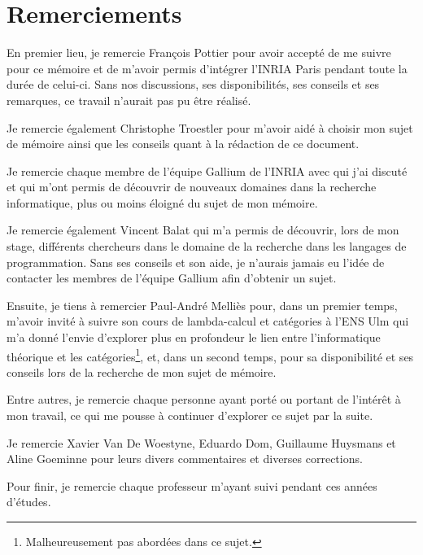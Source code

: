 \chapter*{Remerciements}

En premier lieu, je remercie François Pottier pour avoir accepté de me suivre
pour ce mémoire et de m'avoir permis d'intégrer l'INRIA Paris pendant toute la
durée de celui-ci. Sans nos discussions, ses disponibilités, ses conseils et ses
remarques, ce travail n'aurait pas pu être réalisé.

Je remercie également Christophe Troestler pour m'avoir aidé à choisir mon sujet
de mémoire ainsi que les conseils quant à la rédaction de ce document.

Je remercie chaque membre de l'équipe Gallium de
l'INRIA avec qui j'ai discuté et qui m'ont permis de découvrir de nouveaux
domaines dans la recherche informatique, plus ou moins éloigné du sujet de mon mémoire.

Je remercie également Vincent Balat qui m'a permis de découvrir, lors de mon
stage, différents chercheurs dans le domaine de la recherche dans les langages de
programmation. Sans ses conseils et son aide, je n'aurais jamais eu l'idée de contacter
les membres de l'équipe Gallium afin d'obtenir un sujet.

Ensuite, je tiens à remercier Paul-André Melliès pour, dans un premier temps,
m'avoir invité à suivre son cours de lambda-calcul et catégories à l'ENS Ulm qui
m'a donné l'envie d'explorer plus en profondeur le lien entre l'informatique
théorique et les catégories\footnote{Malheureusement pas abordées dans ce sujet.}, et,
dans un second temps, pour sa disponibilité et ses conseils lors de la recherche
de mon sujet de mémoire.

Entre autres, je remercie chaque personne ayant porté ou portant de l'intérêt à mon
travail, ce qui me pousse à continuer d'explorer ce sujet par la suite.

Je remercie Xavier Van De Woestyne, Eduardo Dom, Guillaume Huysmans et Aline
Goeminne pour leurs divers commentaires et diverses corrections.


Pour finir, je remercie chaque professeur m'ayant suivi pendant ces années
d'études.
